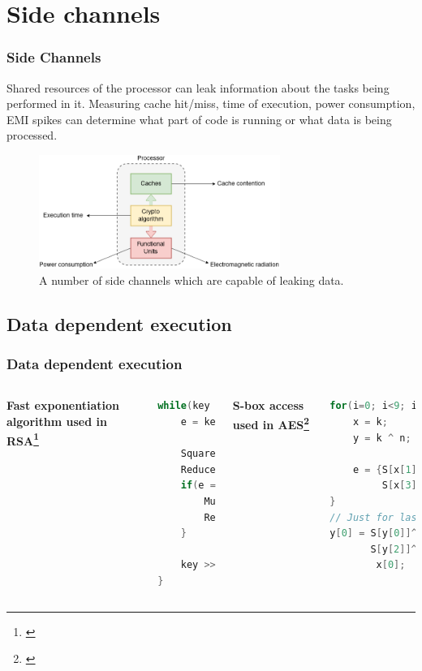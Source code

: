 \documentclass[10pt]{beamer}
\begin{document}
\section{Side channels}

\begin{frame}
\frametitle{Side Channels}

Shared resources of the processor can leak information about the tasks being performed in it.
Measuring cache hit/miss, time of execution, power consumption, EMI spikes can
determine what part of code is running or what data is being processed.

\begin{figure}[h]
    \centering
    \includegraphics[width=0.7\textwidth]{side_channel}
    \caption[Data leakage sources]{A number of side channels which are capable of leaking data.}
\end{figure}
\end{frame}

\subsection{Data dependent execution}
\begin{frame}[fragile]
\frametitle{Data dependent execution}

\begin{columns}[t]
        \textbf{Fast exponentiation algorithm used in RSA\footnote[frame]{\cite{cache_missing}}}
        \begin{lstlisting}[language={C}]
while(key > 0) {
    e = key % 2;

    Square();
    Reduce();
    if(e == 1) {
        Multiply();
        Reduce();
    }

    key >>= 1;
}
        \end{lstlisting}
        \textbf{S-box access used in AES\footnote[frame]{\cite{bern}}}
        \begin{lstlisting}[language={C}]
for(i=0; i<9; i++) {
    x = k;
    y = k ^ n;

    e = {S[x[1]]^1, S[x[2]],
         S[x[3]], S[x[0]]};
}
// Just for last round
y[0] = S[y[0]]^S[y[1]]^
       S[y[2]]^S[y[3]]^
        x[0];
        \end{lstlisting}
\end{columns}
\end{frame}
\end{document}
